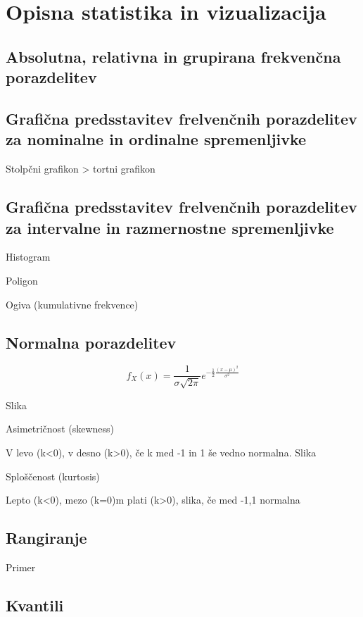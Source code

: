\section{Opisna statistika in vizualizacija}

\subsection*{Absolutna, relativna in grupirana frekvenčna porazdelitev}

\subsection*{Grafična predsstavitev frelvenčnih porazdelitev za nominalne in ordinalne spremenljivke}

Stolpčni grafikon > tortni grafikon

\subsection*{Grafična predsstavitev frelvenčnih porazdelitev za intervalne in razmernostne spremenljivke}

Histogram

Poligon

Ogiva (kumulativne frekvence)

\subsection*{Normalna porazdelitev}

\[f_X(x)=\frac{1}{\sigma\sqrt{2\pi}}e^{-\frac{1}{2}\frac{(x-\mu)^2}{\sigma^2}}\]

Slika

Asimetričnost (skewness)

V levo (k<0), v desno (k>0), če k med -1 in 1 še vedno normalna. Slika

Sploščenost (kurtosis)

Lepto (k<0), mezo (k=0)m plati (k>0), slika, če med -1,1 normalna

\subsection*{Rangiranje}

Primer

\subsection*{Kvantili}

